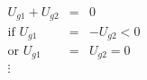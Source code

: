 \documentclass{article}
\begin{document}
\begin{eqnarray*}
U_{g1} + U_{g2} &=& 0 \\
\text{if } U_{g1} &=& - U_{g2} < 0 \\
\text{or } U_{g1} &=& U_{g2} = 0 \\
\vdots
\end{eqnarray*}
\end{document}
